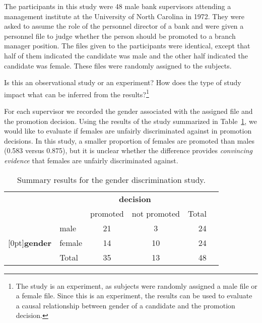 The participants in this study were 48 male bank supervisors attending a management institute at the University of North Carolina in 1972. They were asked to assume the role of the personnel director of a bank and were given a personnel file to judge whether the person should be promoted to a branch manager position. The files given to the participants were identical, except that half of them indicated the candidate was male and the other half indicated the candidate was female. These files were randomly assigned to the subjects.

\begin{exercise}
Is this an observational study or an experiment? How does the type of study impact what can be inferred from the results?\footnote{The study is an experiment, as subjects were randomly assigned a male file or a female file. Since this is an experiment, the results can be used to evaluate a causal relationship between gender of a candidate and the promotion decision.}
\end{exercise}

For each supervisor we recorded the gender associated with the assigned file and the promotion decision. Using the results of the study summarized in Table~\ref{discriminationResults}, we would like to evaluate if females are unfairly discriminated against in promotion decisions. In this study, a smaller proportion of females are promoted than males (0.583 versus 0.875), but it is unclear whether the difference provides \emph{convincing evidence} that females are unfairly discriminated against.

\begin{table}[ht]
\centering
\begin{tabular}{l l cc rr}
& & \multicolumn{2}{c}{\textbf{decision}} \\
  \cline{3-4}
		&			& 	{promoted} 	& {not promoted} & Total & \hspace{3mm}  \\ 
  \cline{2-5}
		&	{male} 			& 21    		& 3   & 24  	 \\ 
  \raisebox{1.5ex}[0pt]{\textbf{gender}}		&	{female} 	& 14    		& 10     & 24	 \\ 
  \cline{2-5}
  		&	Total		& 35	& 13	&  48 \\
  \cline{2-5}
\end{tabular}
\caption{Summary results for the gender discrimination study.}
\label{discriminationResults}
\end{table}

